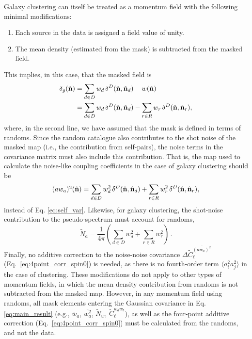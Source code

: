 \documentclass[%
 reprint,
superscriptaddress,
nofootinbib,
 amsmath,amssymb,
 aps,
 prd,
]{revtex4-2}
\newcommand{\nv}{\hat{\bf n}}
\begin{document}
    Galaxy clustering can itself be treated as a momentum field with the following minimal modifications:
    \begin{enumerate}
      \item Each source in the data is assigned a field value of unity.
      \item The mean density (estimated from the mask) is subtracted from the masked field.
    \end{enumerate}
    This implies, in this case, that the masked field is
    \begin{align}\nonumber
      \delta_g(\nv)
      &=\sum_{d\in D}w_d\,\delta^D(\nv,\nv_d)-w(\nv)\\\nonumber
      &=\sum_{d\in D}w_d\,\delta^D(\nv,\nv_d)-\sum_{r\in R}w_r\,\delta^D(\nv,\nv_r),
    \end{align}
    where, in the second line, we have assumed that the mask is defined in terms of randoms. Since the random catalogue also contributes to the shot noise of the masked map (i.e., the contribution from self-pairs), the noise terms in the covariance matrix must also include this contribution. That is, the map used to calculate the noise-like coupling coefficients in the case of galaxy clustering should be
    \begin{equation}
      \overline{(aw_a)^2}(\nv)=\sum_{d\in D}w_d^2\,\delta^D(\nv,\nv_d)+\sum_{r\in R}w_r^2\,\delta^D(\nv,\nv_r),
    \end{equation}
    instead of Eq. \ref{eq:self_var}. Likewise, for galaxy clustering, the shot-noise contribution to the pseudo-spectrum must account for randoms,
    \begin{equation}
      \tilde{N}_a=\frac{1}{4\pi}\left(\sum_{d\in D}w_d^2+\sum_{r\in R}w_r^2\right)\, .
    \end{equation}
    Finally, no additive correction to the noise-noise covariance $\Delta\tilde{C}^{\overline{(aw_a)^2}}_\ell$ (Eq.~\ref{eq:4point_corr_spin0}) is needed, as there is no fourth-order term $\langle a_i^2 a_j^2 \rangle$ in the case of clustering. These modifications do not apply to other types of momentum fields, in which the mean density contribution from randoms is not subtracted from the masked map. However, in any momentum field using randoms, all mask elements entering the Gaussian covariance in Eq. \ref{eq:main_result} (e.g., $\bar{w}_a$, $\overline{w_a^2}$, $\tilde{N}_w$, $\tilde{C}^{w_aw_b}_\ell$), as well as the four-point additive correction (Eq.~\ref{eq:4point_corr_spin0}) must be calculated from the randoms, and not the data.
\end{document}
